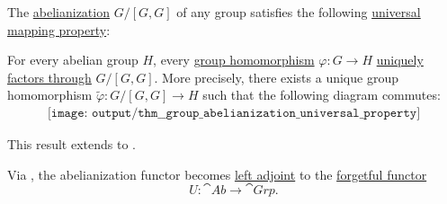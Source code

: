 \begin{theorem}\label{thm:group_abelianization_universal_property}
  The \hyperref[def:group_abelianization]{abelianization} \( G / [G, G] \) of any group satisfies the following \hyperref[rem:universal_mapping_property]{universal mapping property}:
  \begin{displayquote}
    For every abelian group \( H \), every \hyperref[def:group/homomorphism]{group homomorphism} \( \varphi: G \to H \) \hyperref[def:factors_through]{uniquely factors through} \( G / [G, G] \). More precisely, there exists a unique group homomorphism \( \widetilde{\varphi}: G / [G, G] \to H \) such that the following diagram commutes:
    \begin{equation}\label{eq:thm:group_abelianization_universal_property/diagram}
      \begin{aligned}
        \texttt{[image: output/thm\_\_group\_abelianization\_universal\_property]}
      \end{aligned}
    \end{equation}
  \end{displayquote}

\end{theorem}
\begin{comments}
  \item This result extends to .

  \item Via , the abelianization functor becomes \hyperref[def:category_adjunction]{left adjoint} to the \hyperref[def:concrete_category]{forgetful functor}
  \begin{equation*}
    U: \cat{Ab} \to \cat{Grp}.
  \end{equation*}
\end{comments}
